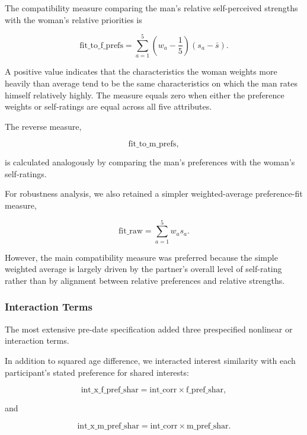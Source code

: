 \documentclass[11pt,letterpaper,reqno]{amsart}
\numberwithin{equation}{subsection}
\theoremstyle{definition}
\numberwithin{thm}{subsection}
\begin{document}
The compatibility measure comparing the man's relative self-perceived strengths with the woman's relative priorities is

\begin{equation}
\text{fit\_to\_f\_prefs}
=
\sum_{a=1}^{5}
\left(
w_a-\frac{1}{5}
\right)
\left(
s_a-\bar{s}
\right).
\end{equation}

A positive value indicates that the characteristics the woman weights more heavily than average tend to be the same characteristics on which the man rates himself relatively highly. The measure equals zero when either the preference weights or self-ratings are equal across all five attributes.

The reverse measure,

\begin{equation}
\text{fit\_to\_m\_prefs},
\end{equation}

is calculated analogously by comparing the man's preferences with the woman's self-ratings.

For robustness analysis, we also retained a simpler weighted-average preference-fit measure,

\begin{equation}
\text{fit\_raw}
=
\sum_{a=1}^{5}
w_as_a.
\end{equation}

However, the main compatibility measure was preferred because the simple weighted average is largely driven by the partner's overall level of self-rating rather than by alignment between relative preferences and relative strengths.

\subsubsection{Interaction Terms}

The most extensive pre-date specification added three prespecified nonlinear or interaction terms.

In addition to squared age difference, we interacted interest similarity with each participant's stated preference for shared interests:

\begin{equation}
\text{int\_x\_f\_pref\_shar}
=
\text{int\_corr}
\times
\text{f\_pref\_shar},
\end{equation}

and

\begin{equation}
\text{int\_x\_m\_pref\_shar}
=
\text{int\_corr}
\times
\text{m\_pref\_shar}.
\end{equation}
\end{document}
